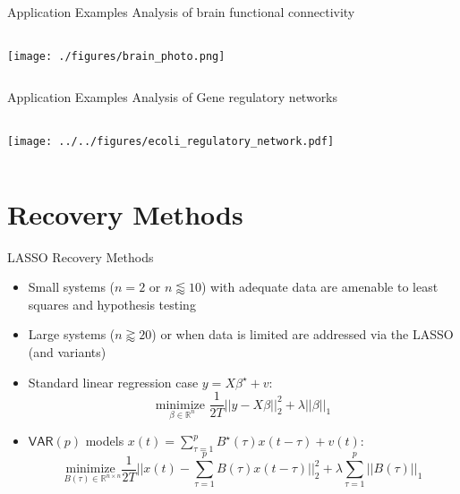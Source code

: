 \documentclass{beamer} %
\def\VAR{\mathsf{VAR}}  %
\def\R{\mathbb{R}}  %
\begin{document}
\begin{frame}{Application Examples}
  Analysis of brain functional connectivity
  
  \begin{columns}
    \begin{column}{0.55\linewidth}
      \texttt{[image: ./figures/brain\_photo.png]}
    \end{column}
  \end{columns}

\end{frame}

\begin{frame}{Application Examples}
  Analysis of Gene regulatory networks
  
  \begin{columns}
    \begin{column}{0.5\linewidth}
      \texttt{[image: ../../figures/ecoli\_regulatory\_network.pdf]}
    \end{column}
  \end{columns}

\end{frame}

\section{Recovery Methods}
\begin{frame}{LASSO Recovery Methods}
  \begin{itemize}
    \item{Small systems ($n = 2$ or $n \lessapprox 10$) with adequate data are amenable to least squares and hypothesis testing}\pause
    \item{Large systems ($n \gtrapprox 20$) or when data is limited are addressed via the LASSO (and variants)}\pause
    \item{Standard linear regression case $y = X\beta^\star + v$:
        \begin{equation*}
          \underset{\beta \in \R^n}{\text{minimize }} \frac{1}{2T}||y - X\beta||_2^2 + \lambda ||\beta||_1
        \end{equation*}
      }\pause
    \item{$\VAR(p)$ models $x(t) = \sum_{\tau = 1}^p B^\star(\tau)x(t - \tau) + v(t)$:
        \begin{equation*}
          \underset{B(\tau) \in \R^{n \times n}}{\text{minimize }} \frac{1}{2T}||x(t) - \sum_{\tau = 1}^p B(\tau)x(t - \tau)||_2^2 + \lambda \sum_{\tau = 1}^p ||B(\tau)||_1
        \end{equation*}
      }
  \end{itemize}
\end{frame}
\end{document}
